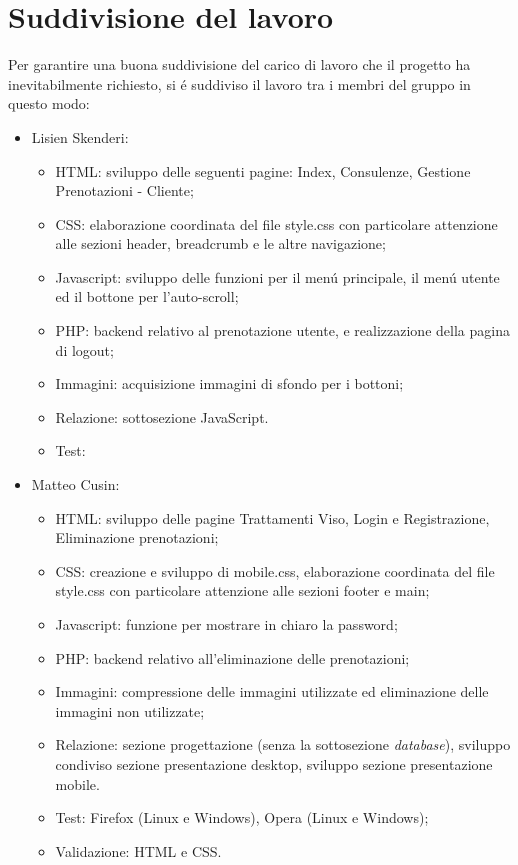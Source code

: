 \documentclass{article}
\begin{document}
\section{Suddivisione del lavoro}
Per garantire una buona suddivisione del carico di lavoro che il progetto ha inevitabilmente richiesto, si é suddiviso il lavoro tra i membri del gruppo in questo modo:
\begin{itemize}
	\item Lisien Skenderi: 
	\begin{itemize}
		\item HTML: sviluppo delle seguenti pagine: Index, Consulenze, Gestione Prenotazioni - Cliente;
		\item CSS:  elaborazione coordinata del file style.css con particolare attenzione alle sezioni header, breadcrumb e le altre navigazione;
		\item Javascript: sviluppo delle funzioni per il menú principale, il menú utente ed il bottone per l'auto-scroll;
		\item PHP: backend relativo al prenotazione utente, e realizzazione della pagina di logout;
		\item Immagini: acquisizione immagini di sfondo per i bottoni;
		\item Relazione: sottosezione JavaScript.
		\item Test:
	\end{itemize}
	\item Matteo Cusin:
	\begin{itemize}
		\item HTML: sviluppo delle pagine Trattamenti Viso, Login e Registrazione, Eliminazione prenotazioni;
		\item CSS: creazione e sviluppo di mobile.css, elaborazione coordinata del file style.css con particolare attenzione alle sezioni footer e main;
		\item Javascript: funzione per mostrare in chiaro la password;
		\item PHP: backend relativo all'eliminazione delle prenotazioni;
		\item Immagini: compressione delle immagini utilizzate ed eliminazione delle immagini non utilizzate;
		\item Relazione: sezione progettazione (senza la sottosezione \textit{database}), sviluppo condiviso sezione presentazione desktop, sviluppo sezione presentazione mobile.
		\item Test: Firefox (Linux e Windows), Opera (Linux e Windows);
		\item Validazione: HTML e CSS.

\end{itemize}
\end{itemize}
\end{document}
